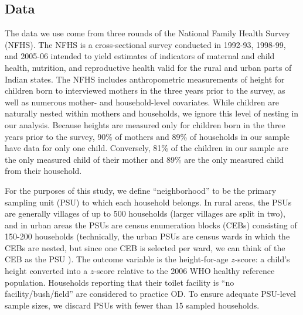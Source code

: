 \documentclass[12pt,a4paper,titlepage]{article}
\begin{document}
\subsection{Data}
The data we use come from three rounds of the National Family Health Survey (NFHS). The NFHS is a cross-sectional survey conducted in 1992-93, 1998-99, and 2005-06 intended to yield estimates of indicators of maternal and child health, nutrition, and reproductive health valid for the rural and urban parts of Indian states. The NFHS includes anthropometric measurements of height for children born to interviewed mothers in the three years prior to the survey, as well as numerous mother- and household-level covariates. While children are naturally nested within mothers and households, we ignore this level of nesting in our analysis. Because heights are measured only for children born in the three years prior to the survey, 90\% of mothers and 89\% of households in our sample have data for only one child. Conversely, 81\% of the children in our sample are the only measured child of their mother and 89\% are the only measured child from their household.

For the purposes of this study, we define ``neighborhood'' to be the primary sampling unit (PSU) to which each household belongs. In rural areas, the PSUs are generally villages of up to 500 households (larger villages are split in two), and in urban areas the PSUs are census enumeration blocks (CEBs) consisting of 150-200 households (technically, the urban PSUs are census wards in which the CEBs are nested, but since one CEB is selected per ward, we can think of the CEB as the PSU \citep{roy_acharya}). The outcome variable is the height-for-age $z$-score: a child's height converted into a $z$-score relative to the 2006 WHO healthy reference population. Households reporting that their toilet facility is ``no facility/bush/field'' are considered to practice OD. To ensure adequate PSU-level sample sizes, we discard PSUs with fewer than 15 sampled households.

\end{document}
